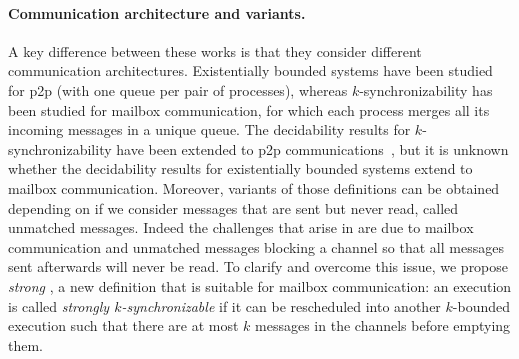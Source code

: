 \documentclass[a4paper,UKenglish,cleveref, autoref, thm-restate]{lipics-v2021}
\begin{document}
\paragraph*{Communication architecture and variants.}
A key difference between these works is that
they consider different communication architectures.
Existentially bounded systems
have been studied for p2p (with one queue per
pair of processes), whereas $k$-synchronizability has been studied
for mailbox communication, for which each process merges
all its incoming messages in a unique queue. The decidability
results for $k$-synchronizability have been extended to p2p
communications~\cite{DBLP:conf/fossacs/GiustoLL20}, but
it is unknown whether the decidability results for existentially
bounded systems extend to mailbox communication. Moreover,
variants of those definitions can be
obtained depending on if we consider %
messages that are sent but never read,
called unmatched messages.
Indeed the challenges that arise  in  \cite{DBLP:conf/cav/BouajjaniEJQ18} are due to mailbox communication and unmatched messages blocking a channel so that all messages sent afterwards will never be read.
To clarify and overcome this issue, we propose \emph{strong }, a new definition that is suitable for mailbox communication: an execution is called \emph{strongly $k$-synchronizable} if it can be rescheduled into another $k$-bounded execution such that there are at most $k$ messages in the channels before emptying them.

\end{document}
